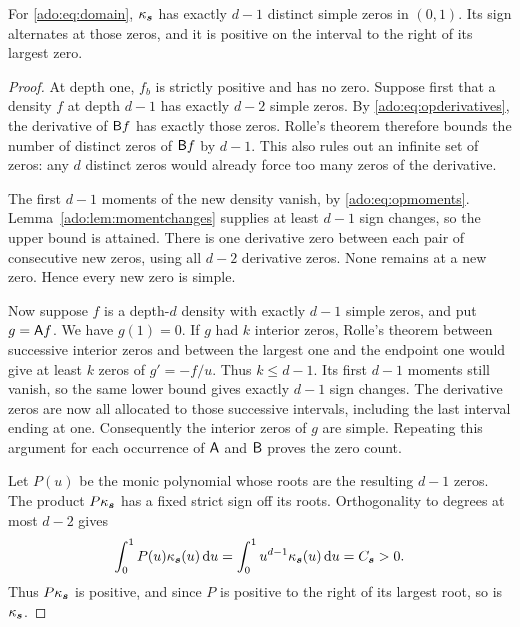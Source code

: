 \begin{theorem}
\label{ado:thm:oscillation}
For \eqref{ado:eq:domain}, $\kappa_{\boldsymbol{s}}$ has exactly $d-1$
distinct simple zeros in $(0,1)$. Its sign alternates at those zeros,
and it is positive on the interval to the right of its largest zero.
\end{theorem}
\begin{proof}
At depth one, $f_b$ is strictly positive and has no zero. Suppose first
that a density $f$ at depth $d-1$ has exactly $d-2$ simple zeros.
By \eqref{ado:eq:opderivatives}, the derivative of $\mathsf B f$ has
exactly those zeros. Rolle's theorem therefore bounds the number of
distinct zeros of $\mathsf B f$ by $d-1$. This also rules out an infinite
set of zeros: any $d$ distinct zeros would already force too many
zeros of the derivative.

The first $d-1$ moments of the new density vanish, by
\eqref{ado:eq:opmoments}. Lemma~\ref{ado:lem:momentchanges} supplies
at least $d-1$ sign changes, so the upper bound is attained. There is
one derivative zero between each pair of consecutive new zeros, using
all $d-2$ derivative zeros. None remains at a new zero. Hence every
new zero is simple.

Now suppose $f$ is a depth-$d$ density with exactly $d-1$ simple
zeros, and put $g=\mathsf A f$. We have $g(1)=0$. If $g$ had $k$
interior zeros, Rolle's theorem between successive interior zeros and
between the largest one and the endpoint one would give at least $k$
zeros of $g'=-f/u$. Thus $k\le d-1$. Its first $d-1$ moments still
vanish, so the same lower bound gives exactly $d-1$ sign changes.
The derivative zeros are now all allocated to those successive
intervals, including the last interval ending at one. Consequently the
interior zeros of $g$ are simple. Repeating this argument for each
occurrence of $\mathsf A$ and $\mathsf B$ proves the zero count.

Let $P(u)$ be the monic polynomial whose roots are the resulting
$d-1$ zeros. The product $P\kappa_{\boldsymbol{s}}$ has a fixed strict sign
off its roots. Orthogonality to degrees at most $d-2$ gives
\[
 \int_0^1P(u)\kappa_{\boldsymbol{s}}(u)\,\mathrm d u
 =\int_0^1u^{d-1}\kappa_{\boldsymbol{s}}(u)\,\mathrm d u=C_{\boldsymbol{s}}>0.
\]
Thus $P\kappa_{\boldsymbol{s}}$ is positive, and since $P$ is positive to
the right of its largest root, so is $\kappa_{\boldsymbol{s}}$.
\end{proof}

